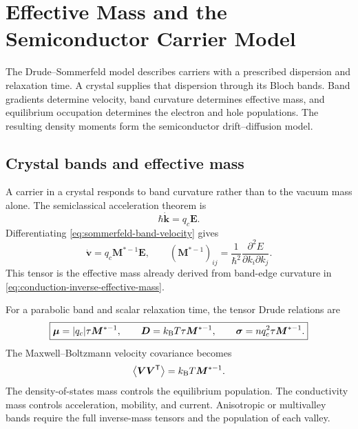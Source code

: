 \chapter{Effective Mass and the Semiconductor Carrier Model}
\label{ch:effective-mass-carrier-model}

The Drude--Sommerfeld model describes carriers with a prescribed dispersion and
relaxation time.  A crystal supplies that dispersion through its Bloch bands.
Band gradients determine velocity, band curvature determines effective mass,
and equilibrium occupation determines the electron and hole populations.  The
resulting density moments form the semiconductor drift--diffusion model.

\section{Crystal bands and effective mass}

A carrier in a crystal responds to band curvature rather than to the vacuum
mass alone.  The semiclassical acceleration theorem is
\begin{equation}
  \hbar\dot{\bm k}=q_c\bm E.
  \label{eq:carrier-acceleration-theorem}
\end{equation}
Differentiating \cref{eq:sommerfeld-band-velocity} gives
\begin{equation}
  \dot{\bm v}=q_c\bm M^{*-1}\bm E,
  \qquad
  \left(\bm M^{*-1}\right)_{ij}
  =\frac1{\hbar^2}
   \frac{\partial^2E}{\partial k_i\partial k_j}.
  \label{eq:carrier-effective-mass-dynamics}
\end{equation}
This tensor is the effective mass already derived from band-edge curvature in
\cref{eq:conduction-inverse-effective-mass}.

For a parabolic band and scalar relaxation time, the tensor Drude relations are
\begin{equation}
  \boxed{
  \bm\mu=|q_c|\tau\bm M^{*-1},
  \qquad
  \bm D=k_{\mathrm B} T\tau\bm M^{*-1},
  \qquad
  \bm\sigma=nq_c^2\tau\bm M^{*-1}.
  }
  \label{eq:carrier-effective-mass-transport}
\end{equation}
The Maxwell--Boltzmann velocity covariance becomes
\begin{equation}
  \left\langle\bm V\bm V^{\mathsf T}\right\rangle
  =k_{\mathrm B} T\bm M^{*-1}.
  \label{eq:carrier-effective-mass-covariance}
\end{equation}
The density-of-states mass controls the equilibrium population.  The
conductivity mass controls acceleration, mobility, and current.  Anisotropic or
multivalley bands require the full inverse-mass tensors and the population of
each valley.

